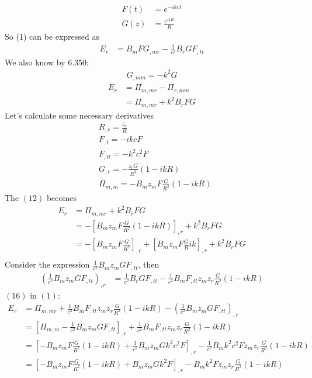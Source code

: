 \begin{align}
F(t)&=e^{-ikct}\\
G(z)&= \frac{e^{ikR}}{R}
\end{align}
So (1) can be expressed as 
\begin{align}
E_r&= B_mFG_{,mr}-\frac{1}{c^2}B_rGF_{,tt}
\end{align}We also know by $\mathbf{6.350}$:
\begin{align}
G_{,mm}=-k^2G
\end{align}
\begin{align}
E_r&= \Pi_{m,mr}-\Pi_{r,mm}\\
&= \Pi_{m,mr}+k^2B_rFG
\end{align}
Let's calculate some necessary derivatives
\begin{align}
&R_{,r} = \frac{z_r}{R}\\
&F_{,t}= -ikcF\\
&F_{,tt}= -k^2c^2F\\
&G_{,r} = -\frac{z_rG}{R^2}\left(1-ikR\right)\\
&\Pi_{m,m} = -B_mz_mF\frac{G}{R^2}\left(1-ikR\right)
\end{align}
The $(12)$ becomes
\begin{align}
E_r&= \Pi_{m,mr}+k^2B_rFG\\
&= -\left[B_mz_mF\frac{G}{R^2}\left(1-ikR\right)\right]_{,r}+k^2B_rFG\\
&= -\left[B_mz_mF\frac{G}{R^2}\right]_{,r}+\left[B_mz_mF\frac{G}{R}ik\right]_{,r}+k^2B_rFG\\
\end{align}
Consider the expression $\frac{1}{c^2}B_mz_mGF_{,tt}$, then
\begin{align}
\left(\frac{1}{c^2}B_mz_mGF_{,tt}\right)_{,r}&= \frac{1}{c^2}B_rGF_{,tt}-\frac{1}{c^2}B_mF_{,tt}z_mz_r\frac{G}{R^2}\left(1-ikR\right)
\end{align}
$(16)$ in $(1)$:
\begin{align}
E_r&= \Pi_{m,mr}+\frac{1}{c^2}B_mF_{,tt}z_mz_r\frac{G}{R^2}\left(1-ikR\right)-\left(\frac{1}{c^2}B_mz_mGF_{,tt}\right)_{,r}\\
&= \left[\Pi_{m,m}-\frac{1}{c^2}B_mz_mGF_{,tt}\right]_{,r}+\frac{1}{c^2}B_mF_{,tt}z_mz_r\frac{G}{R^2}\left(1-ikR\right)\\
&= \left[-B_mz_mF\frac{G}{R^2}\left(1-ikR\right)+\frac{1}{c^2}B_mz_mGk^2c^2F\right]_{,r}-\frac{1}{c^2}B_mk^2c^2Fz_mz_r\frac{G}{R^2}\left(1-ikR\right)\\
&= \left[-B_mz_mF\frac{G}{R^2}\left(1-ikR\right)+B_mz_mGk^2F\right]_{,r}-B_mk^2Fz_mz_r\frac{G}{R^2}\left(1-ikR\right)
\end{align}
